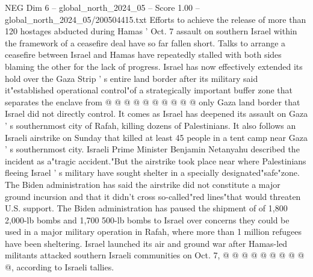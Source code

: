 \begin{textsample}{NEG Dim 6 – global\_north\_2024\_05 – Score 1.00 – global\_north\_2024\_05/200504415.txt}
Efforts to achieve the release of more than 120 hostages abducted during Hamas ' Oct. 7 assault on southern Israel within the framework of a ceasefire deal have so far fallen short.
Talks to arrange a ceasefire between Israel and Hamas have repeatedly stalled with both sides blaming the other for the lack of progress.
Israel has now effectively extended its hold over the Gaza Strip ' s entire land border after its military said it"established operational control"of a strategically important buffer zone that separates the enclave from @ @ @ @ @ @ @ @ @ @ only Gaza land border that Israel did not directly control.
It comes as Israel has deepened its assault on Gaza ' s southernmost city of Rafah, killing dozens of Palestinians.
It also follows an Israeli airstrike on Sunday that killed at least 45 people in a tent camp near Gaza ' s southernmost city.
Israeli Prime Minister Benjamin Netanyahu described the incident as a"tragic accident."But the airstrike took place near where Palestinians fleeing Israel ' s military have sought shelter in a specially designated"safe"zone.
The Biden administration has said the airstrike did not constitute a major ground incursion and that it didn't cross so-called"red lines"that would threaten U.S. support.
The Biden administration has paused the shipment of of 1,800 2,000-lb bombs and 1,700 500-lb bombs to Israel over concerns they could be used in a major military operation in Rafah, where more than 1 million refugees have been sheltering.
Israel launched its air and ground war after Hamas-led militants attacked southern Israeli communities on Oct. 7, @ @ @ @ @ @ @ @ @ @, according to Israeli tallies.

\end{textsample}
